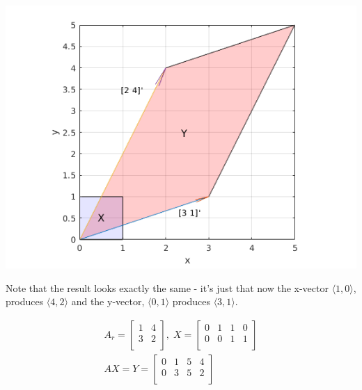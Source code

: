 \documentclass[MathsNotesBase.tex]{subfiles}
\begin{document}
{		\begin{center}
		\includegraphics[scale=0.85]{resources/img/GeometryOfMatrices_images/linear_transformation.png}
		\end{center}
		
		Note that the result looks exactly the same - it's just that now the x-vector $\langle 1, 0 \rangle$, produces $\langle 4, 2 \rangle$ and the y-vector, $\langle 0, 1 \rangle$ produces $\langle 3, 1 \rangle$.
			
		\begin{align*}
		A_r =
		\begin{bmatrix}    
		1  &   4 \\
		3  &   2 \\		
		\end{bmatrix}
		,\; X = 
		\begin{bmatrix}  
		0   &  1  &   1  &   0 \\
		0   &  0  &   1  &   1	\\	
		\end{bmatrix} \\[10pt]
		AX = Y = 
		\begin{bmatrix}   
		0  &   1  &   5  &   4 \\
		0  &   3  &   5  &   2	\\
		\end{bmatrix}
		\end{align*}
		
}
\end{document}
